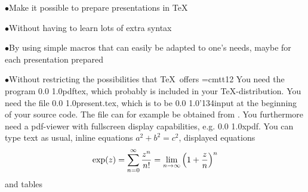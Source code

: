 %
%
%
%
%


\setcolour\textcolour
\setbgcolour\backgroundcolour
\overfullrule=0pt
{}
\NewSlide
{}%
\normalfont
\def\LinkBar{} 	%
%
\SlideFoot 	%
\item{$\bullet$}Make it possible to prepare presentations in \TeX
\vskip3mm
\item{$\bullet$}Without having to learn lots of extra syntax
\vskip3mm
\item{$\bullet$}By using simple macros that can easily be adapted to one's needs, maybe for each presentation prepared
\vskip3mm
\item{$\bullet$}Without restricting the possibilities that \TeX\ offers
\NewSlide
{}
\font\cdfo=cmtt12
\def\codecolour{1.0 0.0 1.0}
\def\cf{\setcolour\codecolour\cdfo}
You need the program {\cf pdftex}, which probably is included in your \TeX-distribution.
\vskip3mm
You need the file {\cf present.tex}, which is to be {\cf\char'134input} at the beginning of your source code.
The file can for example be obtained from .
\vskip3mm
You furthermore need a pdf-viewer with fullscreen display capabilities, e.g. {\cf xpdf}.
\vskip5pt
\NewSlide
{}
You can type text as usual, inline equations $a^2+b^2=c^2$, displayed equations
$$
\exp(z)=\sum_{n=0}^\infty {z^n\over n!}=\lim_{n\to\infty}\Big(1+{z\over n}\Big)^n
$$
and tables
\baselineskip
{}\vbox{\offinterlineskip
{}}\vskip5pt
